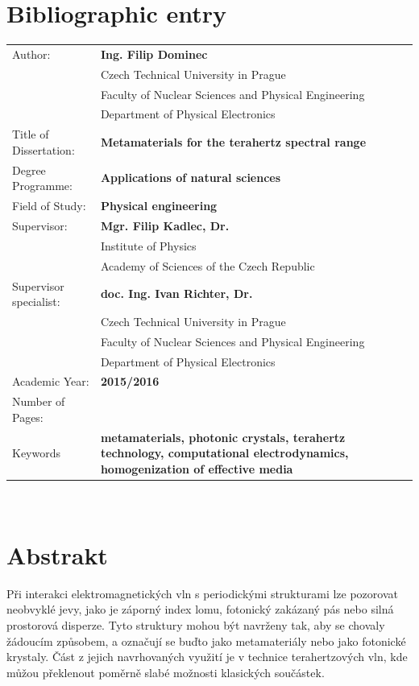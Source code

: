 {\let\clearpage\relax\chapter*{Bibliographic entry}}
\bgroup {}
\noindent\begin{tabular}{p{.30\linewidth}p{.65\linewidth}}
Author:					&\textbf{Ing. Filip Dominec} \\
					~	&Czech Technical University in Prague\\
					~	&Faculty of Nuclear Sciences and Physical Engineering\\ 
					~	&Department of Physical Electronics\\
Title of Dissertation:	&\textbf{Metamaterials for the terahertz spectral range} \\
Degree Programme:		&\textbf{Applications of natural sciences} \\
Field of Study:			&\textbf{Physical engineering} \\
Supervisor:				&\textbf{Mgr. Filip Kadlec, Dr.} \\
					~	&Institute of Physics\\ 
					~	&Academy of Sciences of the Czech Republic\\  %
Supervisor specialist:	&\textbf{doc. Ing. Ivan Richter, Dr.} \\
					~	&Czech Technical University in Prague\\ 
					~	&Faculty of Nuclear Sciences and Physical Engineering\\  
					~	&Department of Physical Electronics\\
Academic Year:			&\textbf{2015/2016} \\
Number of Pages:		&\textbf{\pageref{enddocument}} \\
Keywords				&\textbf{metamaterials, photonic crystals, terahertz technology, computational electrodynamics, homogenization of effective media} \\
\end{tabular}
\egroup
\thispagestyle{empty} \newpage  ~ \thispagestyle{empty} \newpage \setcounter{page}{1}


\vspace{-20mm}
{\let\clearpage\relax\chapter*{Abstrakt}}
\noindent 
Při interakci elektromagnetických vln s periodickými strukturami lze pozorovat neobvyklé jevy, jako je záporný index lomu, fotonický zakázaný pás nebo silná prostorová disperze. Tyto struktury mohou být navrženy tak, aby se chovaly žá\-dou\-cím způsobem, a označují se buďto jako metamateriály nebo jako fotonické krystaly. Část z jejich navrhovaných využití je v technice terahertzových vln, kde můžou překlenout po\-měr\-ně slabé možnosti kla\-sických součástek.  

